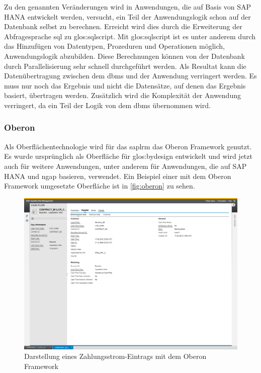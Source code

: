 \begin{onehalfspacing}
Zu den genannten Veränderungen wird in Anwendungen, die auf Basis von SAP HANA entwickelt werden, versucht, ein Teil der Anwendungslogik schon auf der Datenbank selbst zu berechnen. Erreicht wird dies durch die Erweiterung der Abfragesprache \gls{sql} zu \gls{glos:sqlscript}. Mit \gls{glos:sqlscript} ist es unter anderem durch das Hinzufügen von Datentypen, Prozeduren und Operationen möglich, Anwendungslogik abzubilden. Diese Berechnungen können von der Datenbank durch Parallelisierung sehr schnell durchgeführt werden. Als Resultat kann die Datenübertragung zwischen dem \gls{dbms} und der Anwendung verringert werden. Es muss nur noch das Ergebnis und nicht die Datensätze, auf denen das Ergebnis basiert, übertragen werden. Zusätzlich wird die Komplexität der Anwendung verringert, da ein Teil der Logik von dem \gls{dbms} übernommen wird.

\subsubsection{Oberon}
Als Oberflächentechnologie wird für das \gls{saplrm} das Oberon Framework genutzt. Es wurde ursprünglich als Oberfläche für \gls{glos:bydesign} entwickelt und wird jetzt auch für weitere Anwendungen, unter anderem für Anwendungen, die auf SAP HANA und \gls{ngap} basieren, verwendet. Ein Beispiel einer mit dem Oberon Framework umgesetzte Oberfläche ist in \vref{fig:oberon} zu sehen.

\begin{figure}[ht]
\centering
\setlength{\unitlength}{1mm}
\includegraphics[width=15cm]{images/OberonUI-crop.png}
\caption{Darstellung eines Zahlungsstrom-Eintrags mit dem Oberon Framework\label{fig:oberon}}
\end{figure}


\end{onehalfspacing}
